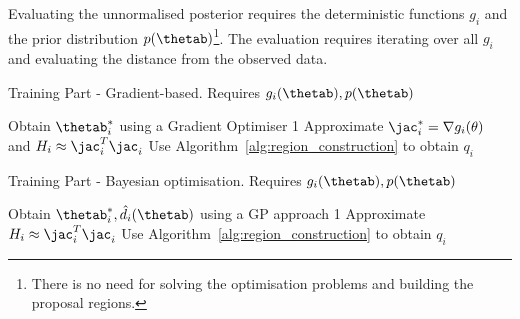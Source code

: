 \noindent
Evaluating the unnormalised posterior requires the deterministic
functions $g_i$ and the prior distribution $p(\thetab)$\footnote{There
  is no need for solving the optimisation problems and building the
  proposal regions.}. The evaluation requires iterating over all $g_i$
and evaluating the distance from the observed data.

\begin{minipage}{0.46\textwidth}
\begin{algorithm}[H]
    \centering
    \caption{Training Part - Gradient-based. Requires $g_i(\thetab), p(\thetab)$}\label{alg:training_GB}
    \begin{algorithmic}[1]
        \State Obtain $\thetab_i^*$ using a Gradient Optimiser
         1
        \Else
        \State Approximate $\jac_i^* = \nabla g_i(\theta)$ and $H_i \approx \jac^T_i\jac_i$
        \State Use Algorithm~\ref{alg:region_construction} to obtain $q_i$
        \EndIf      
      \EndFor
    \end{algorithmic}
\end{algorithm}
\end{minipage}
\hfill
\begin{minipage}{0.46\textwidth}
\begin{algorithm}[H]
    \centering
    \caption{Training Part - Bayesian optimisation. Requires $g_i(\thetab), p(\thetab)$}\label{alg:training_GP}
    \begin{algorithmic}[1]
        \State Obtain $\thetab_i^*, \hat{d}_i(\thetab)$ using a GP approach
         1
        \Else
        \State Approximate $H_i \approx \jac^T_i \jac_i$
        \State Use Algorithm~\ref{alg:region_construction} to obtain $q_i$
        \EndIf      
      \EndFor
    \end{algorithmic}
\end{algorithm}
\end{minipage}


